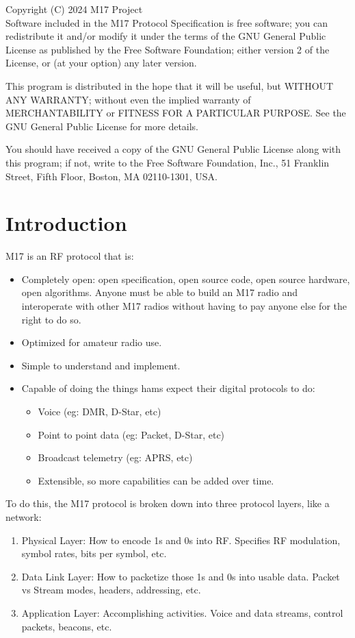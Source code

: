 \documentclass[a4paper,11pt,oneside]{book}
\begin{document}
Copyright (C) 2024  M17 Project \\

Software included in the M17 Protocol Specification is free software; you can redistribute it and/or modify it under the terms of the GNU General Public License as published by the Free Software Foundation; either version 2 of the License, or (at your option) any later version.

This program is distributed in the hope that it will be useful, but WITHOUT ANY WARRANTY; without even the implied warranty of MERCHANTABILITY or FITNESS FOR A PARTICULAR PURPOSE.  See the GNU General Public License for more details.

You should have received a copy of the GNU General Public License along with this program; if not, write to the Free Software Foundation, Inc., 51 Franklin Street, Fifth Floor, Boston, MA  02110-1301, USA.

\chapter{Introduction}

M17 is an RF protocol that is:

\begin{itemize}
	\item
	Completely open: open specification, open source code, open source hardware, open algorithms. Anyone must be able to build an M17 radio and interoperate with other M17 radios without having to pay anyone else for the right to do so.
	\item
	Optimized for amateur radio use.
	\item
	Simple to understand and implement.
	\item
	Capable of doing the things hams expect their digital protocols to do:
	\begin{itemize}
		\item
		Voice (eg: DMR, D-Star, etc)
		\item
		Point to point data (eg: Packet, D-Star, etc)
		\item
		Broadcast telemetry (eg: APRS, etc)
		\item
		Extensible, so more capabilities can be added over time.
	\end{itemize}
\end{itemize}

To do this, the M17 protocol is broken down into three protocol layers,
like a network:

\begin{enumerate}
	\def\labelenumi{\arabic{enumi}.}
	\item
	Physical Layer: How to encode 1s and 0s into RF\@. Specifies RF modulation, symbol rates, bits per symbol, etc.
	\item
	Data Link Layer: How to packetize those 1s and 0s into usable data. Packet vs Stream modes, headers, addressing, etc.
	\item
	Application Layer: Accomplishing activities. Voice and data streams, control packets, beacons, etc.
\end{enumerate}
\end{document}
